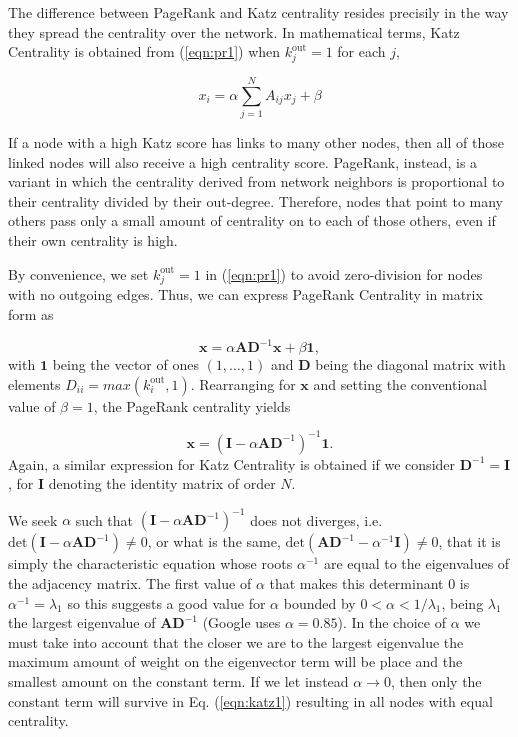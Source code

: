 The difference between PageRank and Katz centrality resides precisily in the way they spread the centrality over the network. In mathematical terms, Katz Centrality is obtained from (\ref{eqn:pr1}) when $k_j^{\text{out}}=1$ for each $j$,

\begin{equation}
\label{eqn:katz1}
    x_i= \alpha\sum_{j=1}^{N}A_{ij}x_j + \beta
\end{equation}

If a node with a high Katz score has links to many other nodes, then all of those linked nodes will also receive a high centrality score. PageRank, instead, is a variant in which the centrality derived from network neighbors is proportional to their centrality divided by their out-degree. Therefore, nodes that point to many others pass only a small amount of centrality on to each of those others, even if their own centrality is high.

By convenience, we set $k_j^{\text{out}}=1$ in (\ref{eqn:pr1}) to avoid zero-division for nodes with no outgoing edges. Thus, we can express PageRank Centrality in matrix form as

\begin{equation}
\label{eqn:pr2}
    \mathbf{x} = \alpha\mathbf{AD}^{-1}\mathbf{x} + \beta \mathbf{1},
\end{equation}
with $\mathbf{1}$ being the vector of ones $(1,\dots,1)$ and $\mathbf{D}$ being the diagonal matrix with elements $D_{ii} = max(k_i^{\text{out}},1)$. Rearranging for $\mathbf{x}$ and setting the conventional value of $\beta=1$, the PageRank centrality yields

\begin{equation}
\label{eqn:pr3}
    \mathbf{x} = (\mathbf{I} - \alpha\mathbf{AD}^{-1})^{-1} \mathbf{1}.
\end{equation}
Again, a similar expression for Katz Centrality is obtained if we consider $\mathbf{D}^{-1}= \mathbf{I}$, for $\mathbf{I}$ denoting the identity matrix of order $N$.

We seek $\alpha$ such that $(\mathbf{I}-\alpha\mathbf{AD}^{-1})^{-1}$ does not diverges, i.e. $\text{det}(\mathbf{I}-\alpha\mathbf{AD}^{-1})\neq 0$, or what is the same, $\text{det}(\mathbf{AD}^{-1}-\alpha^{-1}\mathbf{I})\neq 0$, that it is simply the characteristic equation whose roots $\alpha^{-1}$ are equal to the eigenvalues of the adjacency matrix. The first value of $\alpha$ that makes this determinant $0$ is $\alpha^{-1}=\lambda_1$ so this suggests a good value for $\alpha$ bounded by $0 < \alpha < 1/\lambda_1 $, being $\lambda_1$ the largest eigenvalue of $\mathbf{AD}^{-1}$ (Google uses $\alpha = 0.85$). In the choice of $\alpha$ we must take into account that the closer we are to the largest eigenvalue the maximum amount of weight on the eigenvector term will be place and the smallest amount on the constant term. If we let instead $\alpha\to 0$, then only the constant term will survive in Eq. (\ref{eqn:katz1}) resulting in all nodes with equal centrality.

